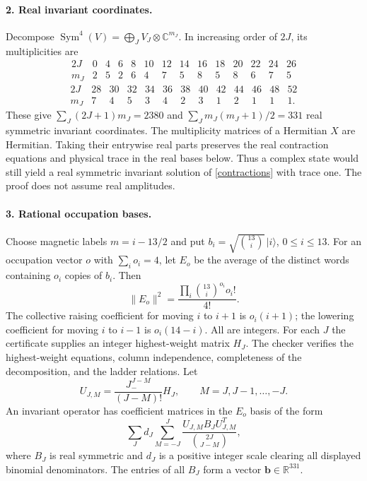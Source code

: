\documentclass[11pt]{article}
\begin{document}
\paragraph{2. Real invariant coordinates.}
Decompose $\operatorname{Sym}^4(V)=\bigoplus_J V_J\otimes\mathbb C^{m_J}$.
In increasing order of $2J$, its multiplicities are
\[
\begin{array}{c|rrrrrrrrrrrrr}
2J&0&4&6&8&10&12&14&16&18&20&22&24&26\\\hline
m_J&2&5&2&6&4&7&5&8&5&8&6&7&5
\end{array}
\]
\[
\begin{array}{c|rrrrrrrrrrrr}
2J&28&30&32&34&36&38&40&42&44&46&48&52\\\hline
m_J&7&4&5&3&4&2&3&1&2&1&1&1.
\end{array}
\]
These give $\sum_J(2J+1)m_J=2380$ and
$\sum_Jm_J(m_J+1)/2=331$ real symmetric invariant coordinates.
The multiplicity matrices of a Hermitian $X$ are Hermitian. Taking their
entrywise real parts preserves the real contraction equations and physical
trace in the real bases below. Thus a complex state would still yield
a real symmetric invariant solution of \eqref{contractions} with trace
one. The proof does not assume real amplitudes.

\paragraph{3. Rational occupation bases.}
Choose magnetic labels $m=i-13/2$ and put
$b_i=\sqrt{\binom{13}{i}}\,|i\rangle$, $0\le i\le13$.
For an occupation vector $o$ with $\sum_i o_i=4$, let $E_o$ be the
average of the distinct words containing $o_i$ copies of $b_i$. Then
\[
 \|E_o\|^2=\frac{\prod_i\binom{13}{i}^{o_i}o_i!}{4!}.
\]
The collective raising coefficient for moving $i$ to $i+1$ is
$o_i(i+1)$; the lowering coefficient for moving $i$ to $i-1$ is
$o_i(14-i)$. All are integers.
For each $J$ the certificate supplies an integer highest-weight matrix
$H_J$. The checker verifies the highest-weight equations, column
independence, completeness of the decomposition, and the ladder relations.
Let
\[
 U_{J,M}=\frac{J_-^{J-M}}{(J-M)!}H_J,
 \qquad M=J,J-1,\ldots,-J.
\]
An invariant operator has coefficient matrices in the $E_o$ basis of
the form
\[
 \sum_J d_J\sum_{M=-J}^{J}
 \frac{U_{J,M}B_J U_{J,M}^{T}}{\binom{2J}{J-M}},
\]
where $B_J$ is real symmetric and $d_J$ is a positive integer scale
clearing all displayed binomial denominators. The entries of all $B_J$
form a vector $\mathbf b\in\mathbb R^{331}$.
\end{document}
